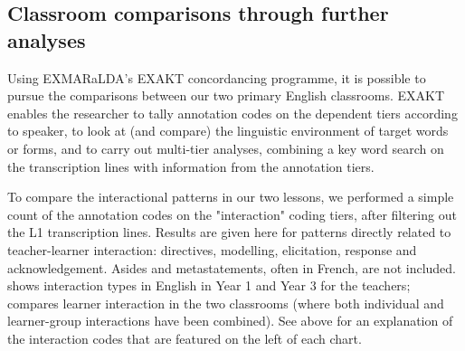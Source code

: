 \documentclass[output=paper,colorlinks,citecolor=brown,modfonts,nonflat]{../langscibook}
\begin{document}
\subsection{{Classroom comparisons through further analyses}}\label{sec:hilton:4.2}

Using EXMARaLDA’s EXAKT concordancing programme, it is possible to pursue the comparisons between our two primary English classrooms. EXAKT enables the researcher to tally annotation codes on the dependent tiers according to speaker, to look at (and compare) the linguistic environment of target words or forms, and to carry out multi-tier analyses, combining a key word search on the transcription lines with information from the annotation tiers.

To compare the interactional patterns in our two lessons, we performed a simple count of the annotation codes on the "interaction" coding tiers, after filtering out the L1 transcription lines. Results are given here for patterns directly related to teacher-learner interaction: directives, modelling, elicitation, response and acknowledgement. Asides and metastatements, often in French, are not included.  shows interaction types in English in Year 1 and Year 3 for the teachers;  compares learner interaction in the two classrooms (where both individual and learner-group interactions have been combined). See  above for an explanation of the interaction codes that are featured on the left of each chart.
\end{document}
